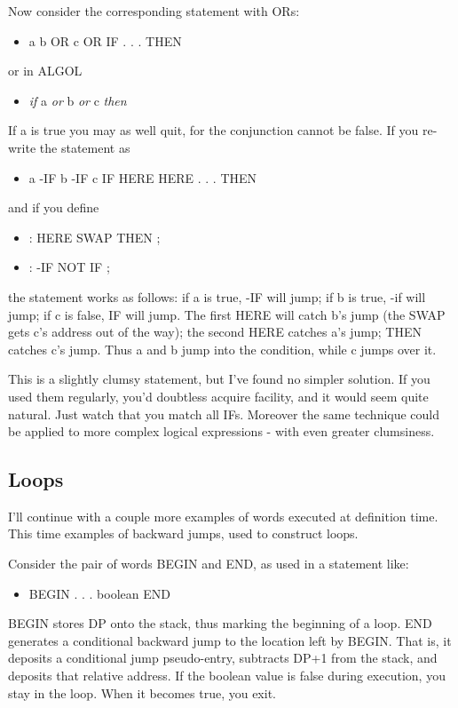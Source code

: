 \documentclass[b5paper, oneside]{book}
\begin{document}
Now consider the corresponding statement with ORs:\begin{itemize}
   \item a b OR c OR IF . . . THEN\end{itemize}
or in ALGOL\begin{itemize}
   \item {\em if} a {\em or} b {\em or} c {\em then}\end{itemize}
If a is true you may as well quit, for the conjunction cannot be false. If you re-write the statement as\begin{itemize}
   \item a -IF b -IF c IF HERE HERE . . . THEN\end{itemize}
and if you define\begin{itemize}
   \item : HERE SWAP THEN ;
   \item : -IF NOT IF ;\end{itemize}
the statement works as follows: if a is true, -IF will jump; if b is true, -if will jump; if c is false, IF will jump. The first HERE will catch b's jump (the SWAP gets c's address out of the way); the second HERE catches a's jump; THEN catches c's jump. Thus a and b jump into the condition, while c jumps over it.

This is a slightly clumsy statement, but I've found no simpler solution. If you used them regularly, you'd doubtless acquire facility, and it would seem quite natural. Just watch that you match all IFs. Moreover the same technique could be applied to more complex logical expressions - with even greater clumsiness.

\subsection{Loops}
I'll continue with a couple more examples of words executed at definition time. This time examples of backward jumps, used to construct loops.

Consider the pair of words BEGIN and END, as used in a statement like:\begin{itemize}
   \item BEGIN . . . boolean END\end{itemize}
BEGIN stores DP onto the stack, thus marking the beginning of a loop. END generates a conditional backward jump to the location left by BEGIN. That is, it deposits a conditional jump pseudo-entry, subtracts DP+1 from the stack, and deposits that relative address. If the boolean value is false during execution, you stay in the loop. When it becomes true, you exit.
\end{document}

